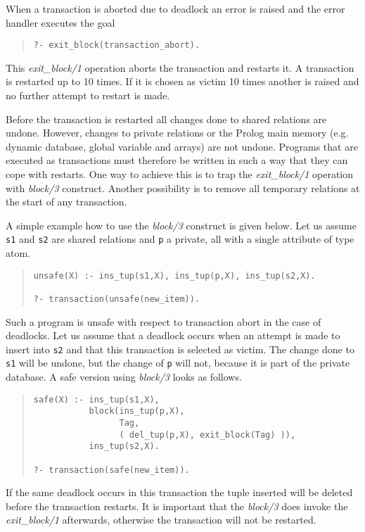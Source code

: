 When a transaction is aborted due to deadlock an error is raised
and the error handler executes the goal

\begin{quote}\begin{verbatim}
?- exit_block(transaction_abort).
\end{verbatim}\end{quote}
This {\em exit\_block/1} operation aborts the transaction and restarts it.
A transaction is restarted up to 10 times. If it is chosen as victim
10 times another is raised and no further attempt to restart is made.

Before the transaction is restarted all changes done to shared relations
are undone. However, changes to private relations or the Prolog
main memory (e.g. dynamic database, global variable and arrays) are not
undone. Programs that are executed as transactions must therefore be
written in such a way that they can cope with restarts. 
One way to achieve this is to trap the {\em exit\_block/1} operation with
{\em block/3} construct. Another possibility is to remove all temporary
relations at the start of any transaction.

A simple example how to use the {\em block/3} construct is given below.
Let us assume \verb+s1+ and \verb+s2+ are shared relations and \verb+p+ 
a private, all with a single attribute of type atom.

\begin{quote}\begin{verbatim}
unsafe(X) :- ins_tup(s1,X), ins_tup(p,X), ins_tup(s2,X).

?- transaction(unsafe(new_item)).
\end{verbatim}\end{quote}
Such a program is unsafe with respect to transaction abort in the case 
of deadlocks. Let us assume that a deadlock occurs when an attempt is 
made to insert into \verb+s2+ and that this transaction is selected as 
victim. The change done to \verb+s1+ will be undone, but the change 
of \verb+p+ will not, because it is part of the private database. 
A safe version using {\em block/3} looks as follows.

\begin{quote}\begin{verbatim}
safe(X) :- ins_tup(s1,X), 
           block(ins_tup(p,X), 
                 Tag, 
                 ( del_tup(p,X), exit_block(Tag) )),
           ins_tup(s2,X).

?- transaction(safe(new_item)). 
\end{verbatim}\end{quote}
If the same deadlock occurs in this transaction the tuple inserted will
be deleted before the transaction restarts. It is important that 
the {\em block/3} does invoke the {\em exit\_block/1} afterwards, 
otherwise the transaction will not be restarted.

